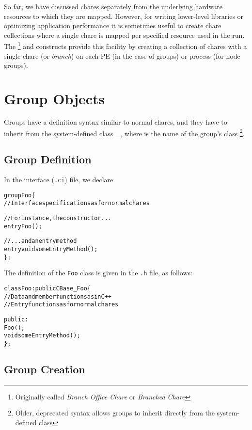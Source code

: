 So far, we have discussed chares separately from the underlying
hardware resources to which they are mapped. However, for writing
lower-level libraries or optimizing application performance it is
sometimes useful to create chare collections where a single chare is
mapped per specified resource used in the run. The
 \footnote{Originally called {\em Branch Office Chare} or
  {\em Branched Chare}} and  constructs provide this
facility by creating a collection of chares with a single
chare (or {\sl branch}) on each PE (in the case of groups) or process
(for node groups). 

\section{Group Objects}
\label{sec:group}

Groups have a definition syntax similar to normal chares, and they
have to inherit from the system-defined class
\_, where  is the name of the
group's \CC{} class \footnote{Older, deprecated syntax allows groups
to inherit directly from the system-defined class }.

\subsection{Group Definition}

In the interface ({\tt .ci}) file, we declare

\begin{alltt}
group Foo \{
  // Interface specifications as for normal chares

  // For instance, the constructor ...
  entry Foo();

  // ... and an entry method
  entry void someEntryMethod();
\};
\end{alltt}

The definition of the {\tt Foo} class is given in the \texttt{.h} file, as follows:

\begin{alltt}
class Foo : public CBase\_Foo \{
  // Data and member functions as in C++
  // Entry functions as for normal chares

  public:
    Foo();
    void someEntryMethod();
\};
\end{alltt}

\subsection{Group Creation}
\label{sec:groups/creation}

